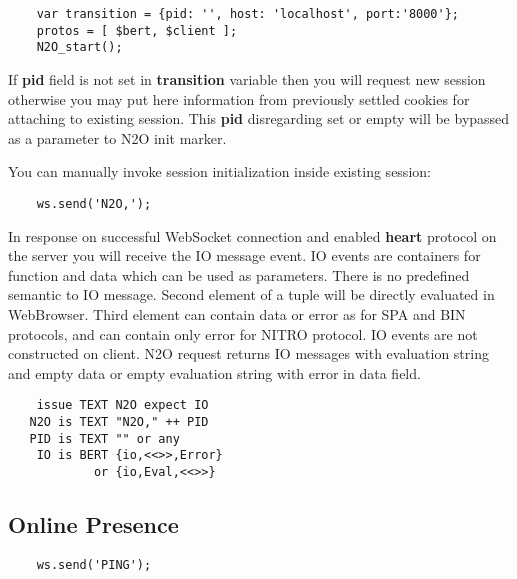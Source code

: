 \vspace{1\baselineskip}
\begin{lstlisting}
    var transition = {pid: '', host: 'localhost', port:'8000'};
    protos = [ $bert, $client ];
    N2O_start();
\end{lstlisting}
\vspace{1\baselineskip}

If {\bf pid} field is not set in {\bf transition} variable then you
will request new session otherwise you may put here information from
previously settled cookies for attaching to existing session. This {\bf pid}
disregarding set or empty will be bypassed as a parameter to N2O init marker.

You can manually invoke session initialization inside existing session:

\vspace{1\baselineskip}
\begin{lstlisting}
    ws.send('N2O,');
\end{lstlisting}

\newpage
In response on successful WebSocket connection and enabled {\bf heart}
protocol on the server you will receive the IO message event.
IO events are containers for function and data which can be used as parameters.
There is no predefined semantic to IO message. Second element of a tuple
will be directly evaluated in WebBrowser. Third element can contain data or error
as for SPA and BIN protocols, and can contain only error for NITRO protocol.
IO events are not constructed on client. N2O request returns IO messages with
evaluation string and empty data or empty evaluation string
with error in data field.

\vspace{1\baselineskip}
\begin{lstlisting}
    issue TEXT N2O expect IO
   N2O is TEXT "N2O," ++ PID
   PID is TEXT "" or any
    IO is BERT {io,<<>>,Error}
            or {io,Eval,<<>>}
\end{lstlisting}
\vspace{1\baselineskip}

\subsection*{Online Presence}

\vspace{1\baselineskip}
\begin{lstlisting}
    ws.send('PING');
\end{lstlisting}
\vspace{1\baselineskip}

